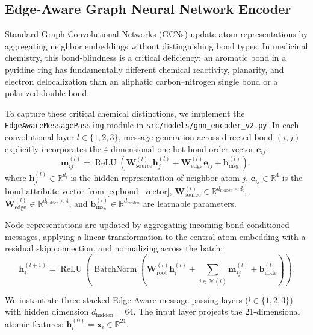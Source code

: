 \documentclass{ieeeaccess}
\begin{document}
\subsection{Edge-Aware Graph Neural Network Encoder}
Standard Graph Convolutional Networks (GCNs) update atom representations by aggregating neighbor embeddings without distinguishing bond types. In medicinal chemistry, this bond-blindness is a critical deficiency: an aromatic bond in a pyridine ring has fundamentally different chemical reactivity, planarity, and electron delocalization than an aliphatic carbon--nitrogen single bond or a polarized double bond.

To capture these critical chemical distinctions, we implement the \texttt{EdgeAwareMessagePassing} module in \texttt{src/models/gnn\_encoder\_v2.py}. In each convolutional layer $l \in \{1, 2, 3\}$, message generation across directed bond $(i, j)$ explicitly incorporates the 4-dimensional one-hot bond order vector $\mathbf{e}_{ij}$:
\begin{equation}
\mathbf{m}_{ij}^{(l)} = \operatorname{ReLU}\left( \mathbf{W}_{\text{source}}^{(l)} \mathbf{h}_j^{(l)} + \mathbf{W}_{\text{edge}}^{(l)} \mathbf{e}_{ij} + \mathbf{b}_{\text{msg}}^{(l)} \right),
\label{eq:edge_message}
\end{equation}
where $\mathbf{h}_j^{(l)} \in \mathbb{R}^{d_l}$ is the hidden representation of neighbor atom $j$, $\mathbf{e}_{ij} \in \mathbb{R}^4$ is the bond attribute vector from \eqref{eq:bond_vector}, $\mathbf{W}_{\text{source}}^{(l)} \in \mathbb{R}^{d_{\text{hidden}} \times d_l}$, $\mathbf{W}_{\text{edge}}^{(l)} \in \mathbb{R}^{d_{\text{hidden}} \times 4}$, and $\mathbf{b}_{\text{msg}}^{(l)} \in \mathbb{R}^{d_{\text{hidden}}}$ are learnable parameters.

Node representations are updated by aggregating incoming bond-conditioned messages, applying a linear transformation to the central atom embedding with a residual skip connection, and normalizing across the batch:
\begin{equation}
\mathbf{h}_i^{(l+1)} = \operatorname{ReLU}\left( \operatorname{BatchNorm}\left( \mathbf{W}_{\text{root}}^{(l)} \mathbf{h}_i^{(l)} + \sum_{j \in \mathcal{N}(i)} \mathbf{m}_{ij}^{(l)} + \mathbf{b}_{\text{node}}^{(l)} \right) \right).
\label{eq:node_update}
\end{equation}

We instantiate three stacked Edge-Aware message passing layers ($l \in \{1, 2, 3\}$) with hidden dimension $d_{\text{hidden}} = 64$. The input layer projects the 21-dimensional atomic features: $\mathbf{h}_i^{(0)} = \mathbf{x}_i \in \mathbb{R}^{21}$.
\end{document}
